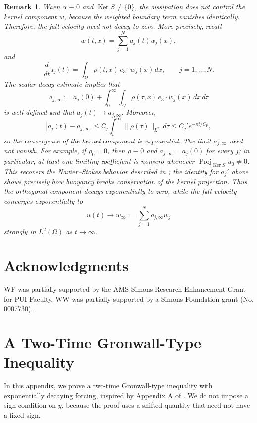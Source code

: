 \documentclass[11pt,reqno]{amsart}
\theoremstyle{plain}
\newtheorem{remark}[thm]{Remark}
\numberwithin{equation}{section}
\DeclareMathOperator{\kernel}{Ker}
\DeclareMathOperator{\Proj}{Proj}
\begin{document}
\begin{remark}
    When $\alpha\equiv0$ and $\kernel S\neq\{0\}$, the dissipation does not control the kernel component $w$, because the weighted boundary term vanishes identically. Therefore, the full velocity need not decay to zero.
    More precisely, recall
    \[
        w(t,x)=\sum_{j=1}^N a_j(t)w_j(x),
    \]
    and
    \[
        \frac{d}{dt}a_j(t)
        =
        \int_\Omega \rho(t,x)\, e_3\cdot w_j(x)\,dx,
        \qquad j=1,\dots,N.
    \]
    The scalar decay estimate implies that
    \[
        a_{j,\infty}
        :=
        a_j(0)+
        \int_0^\infty\int_\Omega \rho(\tau,x)\, e_3\cdot w_j(x)\,dx\,d\tau
    \]
    is well defined and that $a_j(t)\to a_{j,\infty}$.
    Moreover,
    \[
    |a_j(t)-a_{j,\infty}|
    \le C_j\int_t^\infty\|\rho(\tau)\|_{L^2}\,d\tau
    \le C_j' e^{-\kappa t/C_P},
    \]
    so the convergence of the kernel component is exponential. The limit $a_{j,\infty}$ need not vanish. For example, if $\rho_0=0$, then $\rho\equiv0$ and $a_{j,\infty}=a_j(0)$ for every $j$; in particular, at least one limiting coefficient is nonzero whenever $\Proj_{\kernel S}u_0\neq0$. This recovers the Navier--Stokes behavior described in
{\cite[Proposition~7.4 and Theorem~7.5]{Kelliher2025}}; the identity for $a_j'$ above shows precisely how buoyancy breaks conservation of the kernel projection. Thus the orthogonal component decays exponentially to zero, while the full velocity converges exponentially to
    \[
        u(t)\to w_\infty
        :=
        \sum_{j=1}^N a_{j,\infty}w_j
    \]
    strongly in $L^2(\Omega)$ as $t\to\infty$.
\end{remark}


\section*{Acknowledgments}
WF was partially supported by the AMS-Simons Research Enhancement Grant for PUI Faculty. WW was partially supported by a Simons Foundation grant (No. 0007730).


\appendix
\section{A Two-Time Gronwall-Type Inequality}\label{appx1}
In this appendix, we prove a two-time Gronwall-type inequality with exponentially decaying forcing, inspired by Appendix A of \cite{Kelliher2025}. We do not impose a sign condition on $y$, because the proof uses a shifted quantity that need not have a fixed sign.
\end{document}
